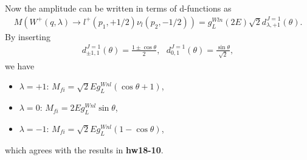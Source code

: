 \documentclass[11pt]{article}
\def\lmd{\lambda}
\def\th{\theta}
\begin{document}
\section{ }
Now the amplitude can be written in terms of d-functions as 
\begin{eqnarray}
    M(W^+(q,\lmd) \to l^+(p_1,+1/2) \nu_l(p_2,-1/2)) =g_L^{Wln} (2E) \sqrt{2} d^{J=1}_{\lmd,+1}(\theta).
\end{eqnarray}
By inserting
\begin{eqnarray}
    d^{J=1}_{\pm 1,1}(\theta)= \frac{1\pm\cos\th}{2},~~~d^{J=1}_{0,1}(\theta)=\frac{\sin\th}{\sqrt 2},
\end{eqnarray}
we have
\begin{itemize}
    \item $\lambda=+1$: $M_{fi}=\sqrt{2}E g_L^{Wnl} (\cos\th+1)$,
    \item $\lambda=0$: $M_{fi}=2E g_L^{Wnl} \sin\th$,
    \item $\lambda=-1$: $M_{fi}=\sqrt{2}E g_L^{Wnl} (1-\cos\th)$,
\end{itemize}
which agrees with the results in {\bf hw18-10}.
\end{document}
